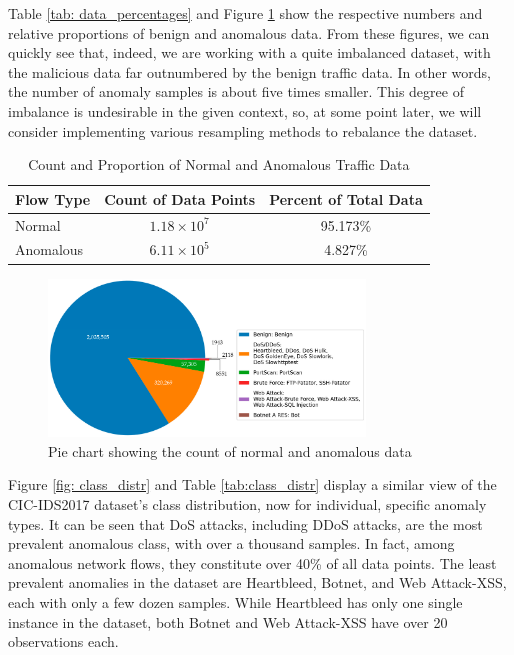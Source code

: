 Table \ref{tab: data_percentages} and Figure \ref{fig:data_count} show the respective numbers and relative proportions of benign and anomalous data. From these figures, we can quickly see that, indeed, we are working with a quite imbalanced dataset, with the malicious data far outnumbered by the benign traffic data. In other words, the number of anomaly samples is about five times smaller. This degree of imbalance is undesirable in the given context, so, at some point later, we will consider implementing various resampling methods to rebalance the dataset.

\begin{table}[h] 
\centering 
\caption{Count and Proportion of Normal and Anomalous Traffic Data}
\label{tab:data_percentages} 
\begin{tabular}{lcc} 
\toprule 
Flow Type & Count of Data Points & Percent of Total Data \\
\midrule 
Normal & $1.18\times10^7$ & 95.173\% \\ 
Anomalous & $6.11\times10^5$ & 4.827\% \\ 
\bottomrule 
\end{tabular} 
\end{table} 

\begin{figure}[H] 
\centering 
\includegraphics[width=0.75\textwidth]{assets/figures/data_count.png} 
\caption{Pie chart showing the count of normal and anomalous data}
\label{fig:data_count} 
\end{figure} 
\parencite{s23218788}

Figure \ref{fig: class_distr} and Table \ref{tab:class_distr} display a similar view of the CIC-IDS2017 dataset's class distribution, now for individual, specific anomaly types. It can be seen that DoS attacks, including DDoS attacks, are the most prevalent anomalous class, with over a thousand samples. In fact, among anomalous network flows, they constitute over 40\% of all data points. The least prevalent anomalies in the dataset are Heartbleed, Botnet, and Web Attack-XSS, each with only a few dozen samples. While Heartbleed has only one single instance in the dataset, both Botnet and Web Attack-XSS have over 20 observations each.

